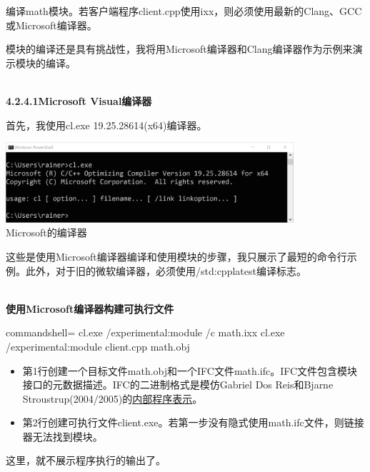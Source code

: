 
编译math模块。若客户端程序client.cpp使用ixx，则必须使用最新的Clang、GCC或Microsoft编译器。

模块的编译还是具有挑战性，我将用Microsoft编译器和Clang编译器作为示例来演示模块的编译。

\hspace*{\fill} \\ %
\noindent
\textbf{4.2.4.1\hspace{0.2cm}Microsoft Visual编译器}

首先，我使用cl.exe 19.25.28614(x64)编译器。

\begin{center}
\includegraphics[width=0.8\textwidth]{content/3/chapter4/images/18.png}\\
Microsoft的编译器
\end{center}

这些是使用Microsoft编译器编译和使用模块的步骤，我只展示了最短的命令行示例。此外，对于旧的微软编译器，必须使用/std:cpplatest编译标志。

\hspace*{\fill} \\ %
\noindent
\textbf{使用Microsoft编译器构建可执行文件}
\begin{tcblisting}{commandshell={}}
cl.exe /experimental:module /c math.ixx
cl.exe /experimental:module client.cpp math.obj
\end{tcblisting}

\begin{itemize}
\item 
第1行创建一个目标文件math.obj和一个IFC文件math.ifc。IFC文件包含模块接口的元数据描述。IFC的二进制格式是模仿Gabriel Dos Reis和Bjarne Stroustrup(2004/2005)的\href{https://www.stroustrup.com/gdr-bs-macis09.pdf}{内部程序表示}。

\item 
第2行创建可执行文件client.exe。若第一步没有隐式使用math.ifc文件，则链接器无法找到模块。
\end{itemize}

这里，就不展示程序执行的输出了。

